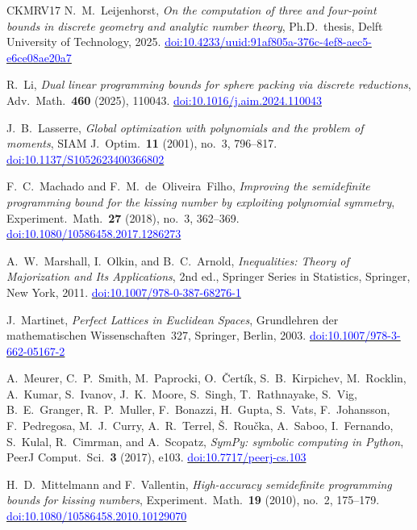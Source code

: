 \documentclass[11pt,reqno]{amsart}
\newcommand{\bluelink}[2]{\href{#1}{\textcolor{blue}{#2}}}
\renewcommand{\_}{\origunderscore\allowbreak}
\numberwithin{equation}{section}
\theoremstyle{plain}
\theoremstyle{definition}
\theoremstyle{remark}
\begin{document}
\begin{thebibliography}{CKMRV17}
N.~M.~Leijenhorst,
\textit{On the computation of three and four-point bounds in discrete
geometry and analytic number theory},
Ph.D.\ thesis, Delft University of Technology, 2025.
\bluelink{https://doi.org/10.4233/uuid:91af805a-376c-4ef8-aec5-e6ce08ae20a7}{doi:10.4233/uuid:91af805a-376c-4ef8-aec5-e6ce08ae20a7}

R.~Li,
\textit{Dual linear programming bounds for sphere packing via discrete
reductions},
Adv.\ Math.\ \textbf{460} (2025), 110043.
\bluelink{https://doi.org/10.1016/j.aim.2024.110043}{doi:10.1016/j.aim.2024.110043}

J.~B.~Lasserre,
\textit{Global optimization with polynomials and the problem of moments},
SIAM J.\ Optim.\ \textbf{11} (2001), no.~3, 796--817.
\bluelink{https://doi.org/10.1137/S1052623400366802}{doi:10.1137/S1052623400366802}

F.~C.~Machado and F.~M.~de~Oliveira~Filho,
\textit{Improving the semidefinite programming bound for the kissing number
by exploiting polynomial symmetry},
Experiment.\ Math.\ \textbf{27} (2018), no.~3, 362--369.
\bluelink{https://doi.org/10.1080/10586458.2017.1286273}{doi:10.1080/10586458.2017.1286273}

A.~W.~Marshall, I.~Olkin, and B.~C.~Arnold,
\textit{Inequalities: Theory of Majorization and Its Applications}, 2nd ed.,
Springer Series in Statistics, Springer, New York, 2011.
\bluelink{https://doi.org/10.1007/978-0-387-68276-1}{doi:10.1007/978-0-387-68276-1}

J.~Martinet,
\textit{Perfect Lattices in Euclidean Spaces},
Grundlehren der mathematischen Wissenschaften~327,
Springer, Berlin, 2003.
\bluelink{https://doi.org/10.1007/978-3-662-05167-2}{doi:10.1007/978-3-662-05167-2}

A.~Meurer, C.~P.~Smith, M.~Paprocki, O.~\v{C}ert\'ik,
S.~B.~Kirpichev, M.~Rocklin, A.~Kumar, S.~Ivanov, J.~K.~Moore,
S.~Singh, T.~Rathnayake, S.~Vig, B.~E.~Granger, R.~P.~Muller,
F.~Bonazzi, H.~Gupta, S.~Vats, F.~Johansson, F.~Pedregosa,
M.~J.~Curry, A.~R.~Terrel, \v{S}.~Rou\v{c}ka, A.~Saboo,
I.~Fernando, S.~Kulal, R.~Cimrman, and A.~Scopatz,
\textit{{S}ym{P}y: symbolic computing in {P}ython},
PeerJ Comput.\ Sci.\ \textbf{3} (2017), e103.
\bluelink{https://doi.org/10.7717/peerj-cs.103}{doi:10.7717/peerj-cs.103}

H.~D.~Mittelmann and F.~Vallentin,
\textit{High-accuracy semidefinite programming bounds for kissing numbers},
Experiment.\ Math.\ \textbf{19} (2010), no.~2, 175--179.
\bluelink{https://doi.org/10.1080/10586458.2010.10129070}{doi:10.1080/10586458.2010.10129070}


\end{thebibliography}
\end{document}
